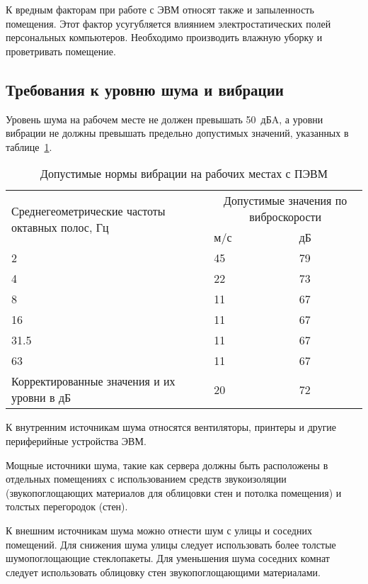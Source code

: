 К вредным факторам при работе с ЭВМ относят также и запыленность помещения.
Этот фактор усугубляется влиянием электростатических полей персональных
компьютеров. Необходимо производить влажную уборку и проветривать помещение.

\subsection{Требования к уровню шума и вибрации}
Уровень шума на рабочем месте не должен превышать 50~дБA, а уровни вибрации не
должны превышать предельно допустимых значений, указанных в
таблице~\ref{tab:vibration}.

\begin{table}[ht!]
  \centering
  \caption{Допустимые нормы вибрации на рабочих местах с ПЭВМ}
  \label{tab:vibration}
  \begin{tabular}{|p{}|p{}|p{}|}
    \hline
    \multirow{2}{\hsize}{Среднегеометрические частоты октавных полос, Гц} &
    \multicolumn{2}{|c|}{Допустимые значения по виброскорости} \\
    \cline{2-3}
    & м/с & дБ \\
    \hline
    2 & 45 & 79 \\
    \hline
    4 & 22 & 73 \\
    \hline
    8 & 11 & 67\\
    \hline
    16 & 11 & 67 \\
    \hline
    31.5 & 11 & 67 \\
    \hline
    63 & 11 & 67 \\
    \hline
    Корректированные значения и их уровни в дБ & 20 & 72 \\
    \hline
  \end{tabular}
\end{table}

К внутренним источникам шума относятся вентиляторы, принтеры и другие
периферийные устройства ЭВМ.

Мощные источники шума, такие как сервера должны быть расположены в отдельных
помещениях с использованием средств звукоизоляции (звукопоглощающих материалов
для облицовки стен и потолка помещения) и толстых перегородок (стен).

К внешним источникам шума можно отнести шум с улицы и соседних помещений. Для
снижения шума улицы следует использовать более толстые шумопоглощающие
стеклопакеты. Для уменьшения шума соседних комнат следует использовать облицовку
стен звукопоглощающими материалами.

